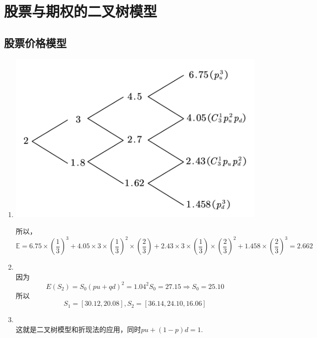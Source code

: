 \section{股票与期权的二叉树模型}
\subsection{股票价格模型}
\begin{enumerate}
    \item \sol
    \begin{center}
        \includegraphics[scale=0.35]{CH3-1-1.pdf}
    \end{center}
    所以，
    \[\mathbb{E} = 6.75\times\left(\frac{1}{3}\right)^3 + 4.05\times3\times\left(\frac{1}{3}\right)^2\times\left(\frac{2}{3}\right)+2.43\times3\times\left(\frac{1}{3}\right)\times\left(\frac{2}{3}\right)^2 + 1.458\times\left(\frac{2}{3}\right)^3 = 2.662\]
    \item \sol\\
    因为
    \[E(S_2) = S_0 (pu+qd)^2 = 1.04^2S_0=27.15 \Rightarrow S_0 = 25.10\]
    所以
    \[S_1 = [30.12, 20.08], S_2 = [36.14,24.10,16.06]\]
    \item \sol\\
    这就是二叉树模型和折现法的应用，同时$pu+(1-p)d=1$.
\end{enumerate}
